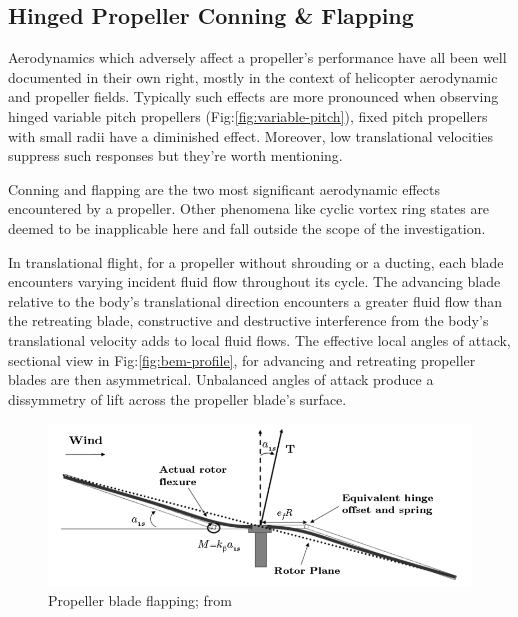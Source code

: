 \subsection{Hinged Propeller Conning \& Flapping}
\label{subsec:dynamics.aero.flap}
Aerodynamics which adversely affect a propeller's performance have all been well documented in their own right, mostly in the context of helicopter aerodynamic and propeller fields\cite{basichelicopter,bramwell}. Typically such effects are more pronounced when observing hinged variable pitch propellers (Fig:\ref{fig:variable-pitch}), fixed pitch propellers with small radii have a diminished effect. Moreover, low translational velocities suppress such responses but they're worth mentioning.
\par
Conning and flapping are the two most significant aerodynamic effects encountered by a propeller. Other phenomena like cyclic vortex ring states are deemed to be inapplicable here and fall outside the scope of the investigation. 
\par
In translational flight, for a propeller without shrouding or a ducting, each blade encounters varying incident fluid flow throughout its cycle. The advancing blade relative to the body's translational direction encounters a greater fluid flow than the retreating blade, constructive and destructive interference from the body's translational velocity adds to local fluid flows. The effective local angles of attack, sectional view in Fig:\ref{fig:bem-profile}, for advancing and retreating propeller blades are then asymmetrical. Unbalanced angles of attack produce a dissymmetry of lift across the propeller blade's surface.
\par
\begin{figure}[htbp]
\centering
\includegraphics[width=\textwidth]{figs/prop-flap}
\caption{Propeller blade flapping; from \cite{starmac}}
\label{fig:prop-flap}
\end{figure}
\par

